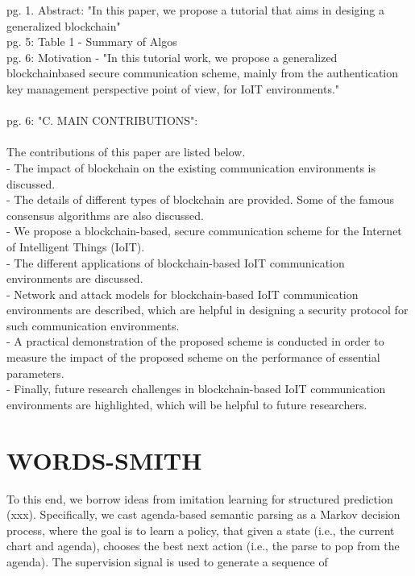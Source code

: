 \documentclass{article}
\begin{document}
		
		
		
		pg. 1. Abstract: "In this paper, we propose a tutorial that aims in desiging a generalized blockchain"\\
		pg. 5: Table 1 - Summary of Algos\\
		pg. 6: Motivation - "In this tutorial work, we propose a generalized blockchainbased secure communication scheme, mainly from the authentication key management perspective point of view, for IoIT environments."\\\\
		pg. 6: "C. MAIN CONTRIBUTIONS":\\\\
		The contributions of this paper are listed below.\\
		- The impact of blockchain on the existing communication environments is discussed.\\
		- The details of different types of blockchain are provided. Some of the famous consensus algorithms are also discussed.\\
		- We propose a blockchain-based, secure communication scheme for the Internet of Intelligent Things (IoIT).\\
		- The different applications of blockchain-based IoIT communication environments are discussed.\\
		- Network and attack models for blockchain-based IoIT communication environments are described, which are helpful in designing a security protocol for such communication environments.\\
		- A practical demonstration of the proposed scheme is conducted in order to measure the impact of the proposed scheme on the performance of essential parameters.\\
		- Finally, future research challenges in blockchain-based IoIT communication environments are highlighted, which will be helpful to future researchers.\\
		
		\section{WORDS-SMITH}
		To this end, we borrow ideas from imitation learning for structured prediction (xxx). Specifically, we cast agenda-based semantic parsing as a Markov decision process, where the goal is to learn a policy, that given a state (i.e., the current chart and agenda), chooses the best next action (i.e., the parse to pop from the agenda). The supervision signal is used to generate a sequence of
		
\end{document}
